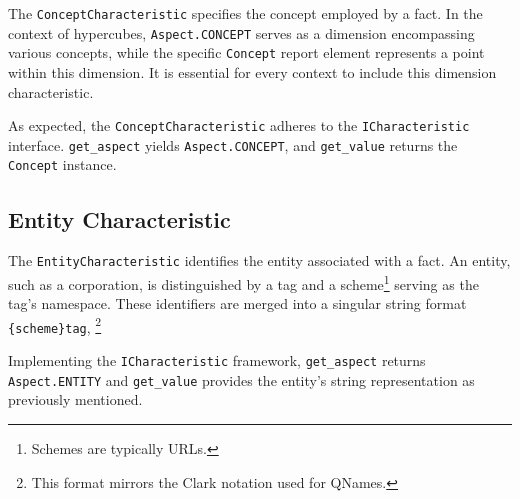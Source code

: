 The \texttt{ConceptCharacteristic} specifies the concept employed by a fact.
In the context of hypercubes, \texttt{Aspect.CONCEPT} serves as a dimension encompassing various concepts,
while the specific \texttt{Concept} report element represents a point within this dimension.
It is essential for every context to include this dimension characteristic.

As expected, the \texttt{ConceptCharacteristic} adheres to the \texttt{ICharacteristic} interface.
\texttt{get\_aspect} yields \texttt{Aspect.CONCEPT}, and \texttt{get\_value} returns the \texttt{Concept} instance.



\subsection{Entity Characteristic}

The \texttt{EntityCharacteristic} identifies the entity associated with a fact.
An entity, such as a corporation, is distinguished by a tag and a scheme\footnote{Schemes are typically URLs.} serving as the tag's namespace.
These identifiers are merged into a singular string format \texttt{\{scheme\}tag},
\footnote{This format mirrors the Clark notation used for QNames.\cite{w3_qnames}}

Implementing the \texttt{ICharacteristic} framework,
\texttt{get\_aspect} returns \texttt{Aspect.ENTITY} and \texttt{get\_value} provides the entity's string representation as previously mentioned.

